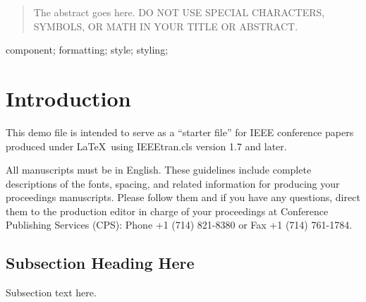 \documentclass[10pt, conference, compsocconf]{IEEEtran}
\begin{document}




\maketitle


\begin{abstract}
The abstract goes here. DO NOT USE SPECIAL CHARACTERS, SYMBOLS, OR MATH IN YOUR TITLE OR ABSTRACT.

\end{abstract}

\begin{IEEEkeywords}
component; formatting; style; styling;

\end{IEEEkeywords}


%
\IEEEpeerreviewmaketitle



\section{Introduction}
This demo file is intended to serve as a ``starter file''
for IEEE conference papers produced under \LaTeX\ using
IEEEtran.cls version 1.7 and later.

All manuscripts must be in English. These guidelines include complete descriptions of the fonts, spacing, and related information for producing your proceedings manuscripts. Please follow them and if you have any questions, direct them to the production editor in charge of your proceedings at Conference Publishing Services (CPS): Phone +1 (714) 821-8380 or Fax +1 (714) 761-1784.

\subsection{Subsection Heading Here}
Subsection text here.
\end{document}
